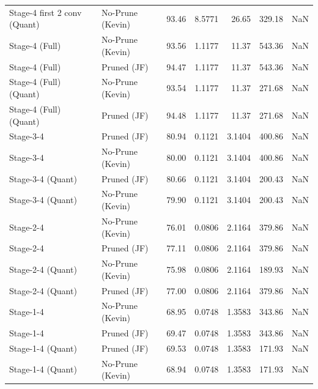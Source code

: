 \begin{table}
\begin{tabular}{llrrrrl}
Stage-4 first 2 conv
(Quant) & No-Prune (Kevin) & 93.46 & 8.5771 & 26.65 & 329.18 & NaN \\
Stage-4 (Full) & No-Prune (Kevin) & 93.56 & 1.1177 & 11.37 & 543.36 & NaN \\
Stage-4 (Full) & Pruned (JF) & 94.47 & 1.1177 & 11.37 & 543.36 & NaN \\
Stage-4 (Full)
(Quant) & No-Prune (Kevin) & 93.54 & 1.1177 & 11.37 & 271.68 & NaN \\
Stage-4 (Full)
(Quant) & Pruned (JF) & 94.48 & 1.1177 & 11.37 & 271.68 & NaN \\
Stage-3-4 & Pruned (JF) & 80.94 & 0.1121 & 3.1404 & 400.86 & NaN \\
Stage-3-4 & No-Prune (Kevin) & 80.00 & 0.1121 & 3.1404 & 400.86 & NaN \\
Stage-3-4
(Quant) & Pruned (JF) & 80.66 & 0.1121 & 3.1404 & 200.43 & NaN \\
Stage-3-4
(Quant) & No-Prune (Kevin) & 79.90 & 0.1121 & 3.1404 & 200.43 & NaN \\
Stage-2-4 & No-Prune (Kevin) & 76.01 & 0.0806 & 2.1164 & 379.86 & NaN \\
Stage-2-4 & Pruned (JF) & 77.11 & 0.0806 & 2.1164 & 379.86 & NaN \\
Stage-2-4
(Quant) & No-Prune (Kevin) & 75.98 & 0.0806 & 2.1164 & 189.93 & NaN \\
Stage-2-4
(Quant) & Pruned (JF) & 77.00 & 0.0806 & 2.1164 & 379.86 & NaN \\
Stage-1-4 & No-Prune (Kevin) & 68.95 & 0.0748 & 1.3583 & 343.86 & NaN \\
Stage-1-4 & Pruned (JF) & 69.47 & 0.0748 & 1.3583 & 343.86 & NaN \\
Stage-1-4
(Quant) & Pruned (JF) & 69.53 & 0.0748 & 1.3583 & 171.93 & NaN \\
Stage-1-4
(Quant) & No-Prune (Kevin) & 68.94 & 0.0748 & 1.3583 & 171.93 & NaN \\
\bottomrule
\end{tabular}
\end{table}
